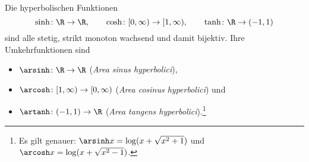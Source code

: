 \documentclass[a4paper]{article}
\begin{document}
\begin{definition}[Areafunktionen]
    Die hyperbolischen Funktionen
    \begin{equation*}
        \sinh\colon \R \to \R,\qquad \cosh\colon [0,\infty) \to [1,\infty),\qquad \tanh\colon \R \to (-1,1)
    \end{equation*}
    sind alle stetig, strikt monoton wachsend und damit bijektiv. Ihre Umkehrfunktionen sind
    \begin{itemize}
        \item $\arsinh\colon \R \to \R$ (\emph{Area sinus hyperbolici}),
        \item $\arcosh\colon [1,\infty) \to [0,\infty)$ (\emph{Area cosinus hyperbolici}) und
        \item $\artanh\colon (-1,1) \to \R$ (\emph{Area tangens hyperbolici}).\footnote{Es gilt genauer: $\arsinh x = \log(x+\sqrt{x^2+1})$ und $\arcosh x = \log(x+\sqrt{x^2-1})$.}
    \end{itemize}
\end{definition}
\end{document}
